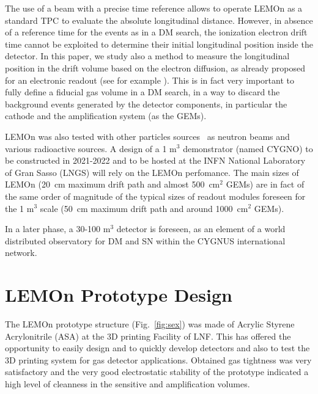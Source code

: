 \documentclass[review]{elsarticle}
\begin{document}
    
    The use of a beam with a precise time reference allows to operate LEMOn as a standard TPC to evaluate the absolute longitudinal distance.
    However, in absence of a reference time for the events as in a DM search, the ionization electron drift time cannot be exploited to determine  their initial longitudinal position inside the detector. In this paper, we study also a method to measure the  longitudinal position in the drift volume based on the electron diffusion, as already proposed for an  electronic readout (see for example \cite{bib:lewis,FENG201735}). This is in fact very important to fully define a fiducial gas volume in a DM search, in a way to discard the  background events  generated by the detector components, in particular the cathode and the amplification system (as the GEMs)\cite{Battat:2015rna,Daw:2013waa}.

  
LEMOn was also tested with other  particles sources~\cite{bib:eps, bib:ieee17, bib:elba, Costa:2019tnu}  as neutron beams and  various radioactive sources.
A design of a  1 m$^3$ demonstrator (named CYGNO) to be constructed in  2021-2022 and to be hosted at the INFN  National Laboratory of Gran Sasso (LNGS) will rely on the LEMOn perfomance.
The main sizes of LEMOn (20~cm maximum drift path and almost 500~cm$^2$ GEMs) are in fact of the same order of magnitude of the typical sizes of readout modules foreseen for the  1 m$^3$  scale (50~cm maximum drift path and around 1000~cm$^2$ GEMs).

 In a later phase, a 30-100 m$^3$ detector is foreseen, as an element of a world distributed observatory for DM and SN within the CYGNUS international network\cite{baracchini2019cygno, Abe:2020bbf,CYGNUSweb}.


\section{LEMOn Prototype Design}

The LEMOn prototype structure (Fig.~\ref{fig:sex}) was made of  Acrylic Styrene Acrylonitrile  (ASA) at the 3D printing Facility of LNF\cite{3dprinting}. This has offered the opportunity  to easily design and to quickly develop detectors and also to test the 3D printing system for gas detector applications.
Obtained gas tightness was very satisfactory and the very good electrostatic stability of the prototype \cite{bib:stab} indicated a high level of cleanness in the sensitive and amplification volumes.
\end{document}
